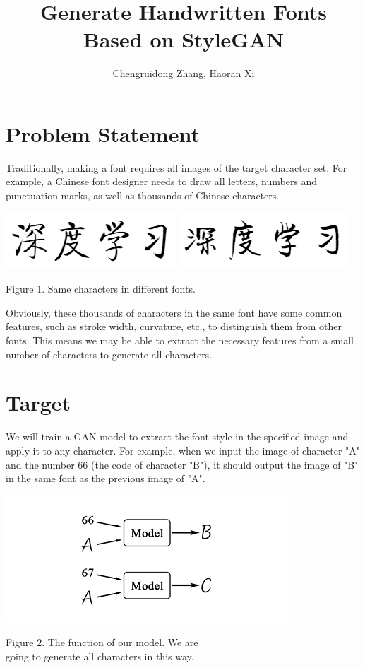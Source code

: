 \documentclass[letterpaper]{article}
\begin{document}
%
\title{Generate Handwritten Fonts \\ Based on StyleGAN}
\author{Chengruidong Zhang, Haoran Xi}
\maketitle

\section{Problem Statement}
Traditionally, making a font requires all images of the target character set. For example, a Chinese font designer needs to draw all letters, numbers and punctuation marks, as well as thousands of Chinese characters.
\begin{center}
    \includegraphics[]{proposal-fig-qiti.png}
    \includegraphics[]{proposal-fig-jinglei.png}

    Figure 1. Same characters in different fonts. 
\end{center}
Obviously, these thousands of characters in the same font have some common features, such as stroke width, curvature, etc., to distinguish them from other fonts. This means we may be able to extract the necessary features from a small number of characters to generate all characters.

\section{Target}
We will train a GAN model to extract the font style in the specified image and apply it to any character. For example, when we input the image of character "A" and the number 66 (the code of character "B"), it should output the image of "B" in the same font as the previous image of "A".
\begin{center}
    \includegraphics[]{proposal-fig-model.png}

    Figure 2. The function of our model. We are\\ going to generate all characters in this way.
\end{center}
\end{document}
